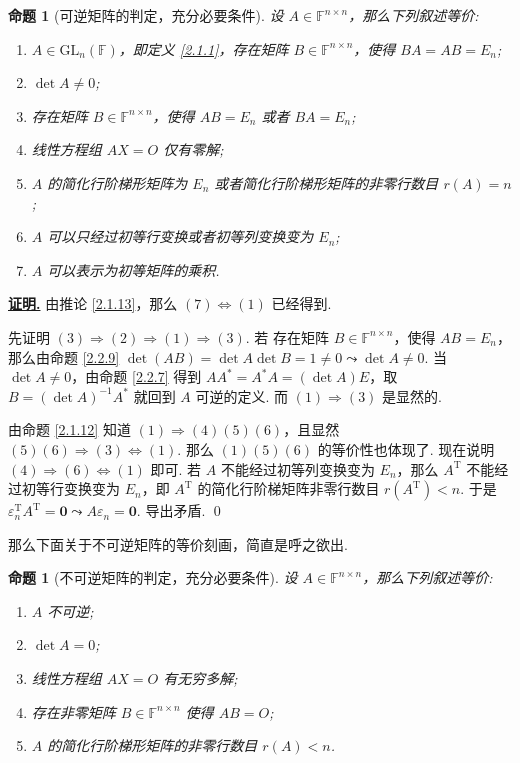 \documentclass[10pt,openany]{article}
\theoremstyle{thmstyle} %
\theoremstyle{defstyle} %
\theoremstyle{prostyle} %
\newtheorem{proposition}[theorem]{命题}
\theoremstyle{exastyle}
\theoremstyle{remstyle}
\renewenvironment{proof}[1][证明]{\par\underline{\textbf{#1.}} \;\fangsong}{\qed\par}
\newcommand{\T}{^{\text{T}}}
\newcommand{\F}{\mathbb{F}}
\newcommand{\gf}{\text{GL}_n(\mathbb{F})}
\newcommand{\n}{^{n \times n}}
\begin{document}
\begin{proposition}[可逆矩阵的判定，充分必要条件]	\label{2.2.13}
	设 \( A \in \F\n \)，那么下列叙述等价:
	\begin{enumerate}[(1)]
		\item \( A \in \gf \)，即定义 \ref{2.1.1}，存在矩阵 \( B \in \F\n \)，使得 \( BA=AB=E_n \);
		\item \( \det A \neq 0 \);
		\item 存在矩阵 \( B \in \F\n \)，使得 \( AB=E_n \) 或者 \( BA=E_n \);
		\item 线性方程组 \( AX=O \) 仅有零解;
		\item \( A \) 的简化行阶梯形矩阵为 \( E_n \) 或者简化行阶梯形矩阵的非零行数目 \( r(A)=n \);
		\item \( A \) 可以只经过初等行变换或者初等列变换变为 \( E_n \);
		\item \( A \) 可以表示为初等矩阵的乘积.
	\end{enumerate}

\end{proposition}

\begin{proof}
	由推论 \ref{2.1.13}，那么 \( (7) \Leftrightarrow (1) \) 已经得到.
	 
	先证明 \( (3) \Rightarrow (2) \Rightarrow (1) \Rightarrow (3) \). 若 存在矩阵 \( B \in \F\n \)，使得 \( AB=E_n \)，那么由命题 \ref{2.2.9} \( \det(AB)=\det A \det B=1 \neq 0 \leadsto \det A \neq 0 \). 当 \( \det A \neq 0 \)，由命题 \ref{2.2.7} 得到 \( AA^*=A^*A=(\det A) E \)，取 \( B=(\det A)^{-1}A^* \) 就回到 \( A \) 可逆的定义. 而 \( (1) \Rightarrow (3) \) 是显然的.
	
	由命题 \ref{2.1.12} 知道 \( (1)  \Rightarrow (4)(5)(6) \)，且显然 \( (5)(6) \Rightarrow (3) \Leftrightarrow (1) \). 那么 \( (1)(5)(6) \) 的等价性也体现了. 现在说明 \( (4) \Rightarrow (6) \Leftrightarrow (1) \) 即可. 若 \( A \) 不能经过初等列变换变为 \( E_n \)，那么 \( A\T \) 不能经过初等行变换变为 \( E_n \)，即 \( A\T \) 的简化行阶梯矩阵非零行数目 \( r(A\T) <n \). 于是 \( \varepsilon_n\T A\T=\bm{0} \leadsto A\varepsilon_n=\bm{0} \). 导出矛盾.
\end{proof}

那么下面关于不可逆矩阵的等价刻画，简直是呼之欲出.

\begin{proposition}[不可逆矩阵的判定，充分必要条件]	\label{2.2.14}
	设 \( A \in \F\n \)，那么下列叙述等价:
	\begin{enumerate}[(1)]
		\item \( A \) 不可逆;
		\item \( \det A = 0 \);
		\item 线性方程组 \( AX=O \) 有无穷多解;
		\item 存在非零矩阵 \( B \in \F\n \) 使得 \( AB=O \);
		\item \( A \) 的简化行阶梯形矩阵的非零行数目 \( r(A)<n \).
	\end{enumerate}

\end{proposition}
\end{document}
